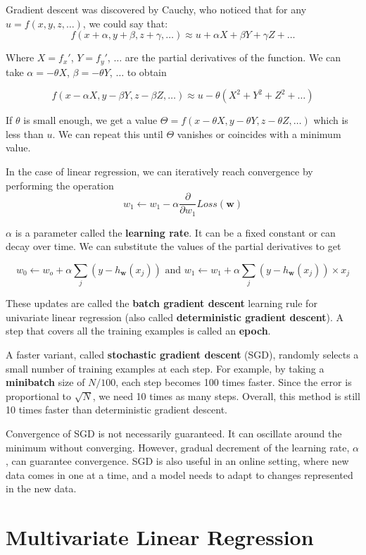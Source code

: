 \documentclass{article}
\begin{document}
Gradient descent was discovered by Cauchy, who noticed that for any $u = f(x, y, z, \dots)$,
we could say that:
\[
f(x + \alpha, y + \beta, z + \gamma, \dots) \approx u + \alpha X + \beta Y + \gamma Z + \dots
\]

Where $X = f_x'$, $Y = f_y'$, $\dots$ are the partial derivatives of the function.
We can take $\alpha = -\theta X$, $\beta = -\theta Y$, $\dots$ to obtain

\[
f(x - \alpha X, y - \beta Y, z - \beta Z, \dots) \approx u - \theta(X^2 + Y^2 + Z^2 + \dots)
\]

If $\theta$ is small enough, we get a value $\Theta = f(x - \theta X, y - \theta Y, z - \theta Z, \dots)$
which is less than $u$. We can repeat this until $\Theta$ vanishes or coincides with
a minimum value. 

In the case of linear regression, we can iteratively reach convergence by performing
the operation
\[
w_1 \gets w_1 - \alpha \frac{\partial}{\partial w_1} Loss(\textbf{w})
\]

$\alpha$ is a parameter called the \textbf{learning rate}. It can be a fixed constant or
can decay over time. We can substitute the values of the partial derivatives to get

\[
w_0 \gets w_o + \alpha \sum_j (y - h_{\textbf{w}}(x_j))
\text{ and } w_1 \gets w_1 + \alpha \sum_j(y - h_{\textbf{w}}(x_j)) \times x_j
\]

These updates are called the \textbf{batch gradient descent} learning rule for
univariate linear regression (also called \textbf{deterministic gradient descent}).
A step that covers all the training examples is called an \textbf{epoch}.

A faster variant, called \textbf{stochastic gradient descent} (SGD), randomly selects a
small number of training examples at each step. For example, by taking a \textbf{minibatch} size
of $N/100$, each step becomes 100 times faster. Since the error is proportional to
$\sqrt{N}$, we need 10 times as many steps. Overall, this method is still 10 times
faster than deterministic gradient descent.

Convergence of SGD is not necessarily guaranteed. It can oscillate around the
minimum without converging. However, gradual decrement of the learning rate, $\alpha$,
can guarantee convergence. SGD is also useful in an online setting, where new data
comes in one at a time, and a model needs to adapt to changes represented in the
new data.

\section{Multivariate Linear Regression}
\end{document}
